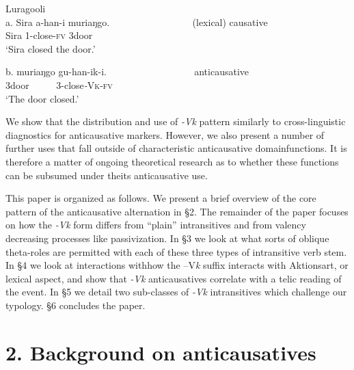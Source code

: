 \documentclass[output=paper]{langsci/langscibook}
\begin{document}
\ea
 {  Luragooli}\\
\gll a.  Sira a-han-i       muriaŋgo.~~~ ~~~ ~~~ ~~~ ~~    (lexical) causative\\
       Sira 1-close-\textsc{fv} 3door\\
\glt ‘Sira closed the door.’
\z

\ea
\gll b.  muriaŋgo gu-han-ik-i.~~~ ~~~ ~~~ ~~~ ~~~     anticausative\\
       3door ~~~~~3-close\textit{{}-}\textsc{Vk}{}-\textsc{fv}\\
\glt ‘The door closed.’
\z

We show that the distribution and use of \textit{{}-Vk} pattern similarly to cross-linguistic diagnostics for anticausative markers. However, we also present a number of further uses that fall outside of characteristic anticausative domainfunctions. It is therefore a matter of ongoing theoretical research as to whether these functions can be subsumed under theits anticausative use.

This paper is organized as follows. We present a brief overview of the core pattern of the anticausative alternation in §2. The remainder of the paper focuses on how the \textit{{}-Vk }form differs from “plain” intransitives and from valency decreasing processes like passivization. In §3 we look at what sorts of oblique theta-roles are permitted with each of these three types of intransitive verb stem. In §4 we look at interactions withhow the –V\textit{k }suffix interacts with Aktionsart, or lexical aspect, and show that \textit{{}-Vk} anticausatives correlate with a telic reading of the event. In §5 we detail two sub-classes of \textit{{}-Vk} intransitives which challenge our typology. §6 concludes the paper. 

\chapter{2. Background on anticausatives}
\end{document}
